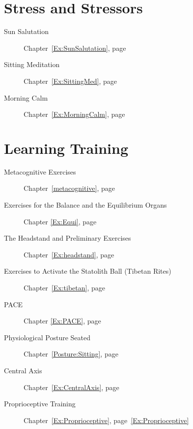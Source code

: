 \documentclass[../main.tex]{subfiles}
\begin{document}
%
\section{Stress and Stressors}

\begin{description}
\item[Sun Salutation] Chapter~\ref{Ex:SunSalutation}, page~\pageref{Ex:SunSalutation}
      \item[Sitting Meditation] Chapter~\ref{Ex:SittingMed}, page~\pageref{Ex:SittingMed}
  \item[Morning Calm] Chapter~\ref{Ex:MorningCalm}, page~\pageref{Ex:MorningCalm}
  \end{description}

\section{Learning Training}
\begin{description} 
\item[Metacognitive Exercises] Chapter~\ref{metacognitive}, page~\pageref{metacognitive}
\item[Exercises for the Balance and the Equilibrium Organs] Chapter \ref{Ex:Equi}, page~\pageref{Ex:Equi}
\item[The Headstand and Preliminary Exercises] Chapter~\ref{Ex:headstand}, page~\pageref{Ex:headstand}
\item[Exercises to Activate the Statolith Ball (Tibetan Rites)] Chapter~\ref{Ex:tibetan}, page~\pageref{Ex:tibetan}
\item[PACE] Chapter \ref{Ex:PACE}, page \pageref{Ex:PACE}
\item[Physiological Posture Seated] Chapter~\ref{Posture:Sitting}, page~\pageref{Posture:Sitting}
\item[Central Axis] Chapter~\ref{Ex:CentralAxis}, page~\pageref{Ex:CentralAxis}
\item[Proprioceptive Training] Chapter~\ref{Ex:Proprioceptive}, page~\ref{Ex:Proprioceptive}
\end{description}
\end{document}
